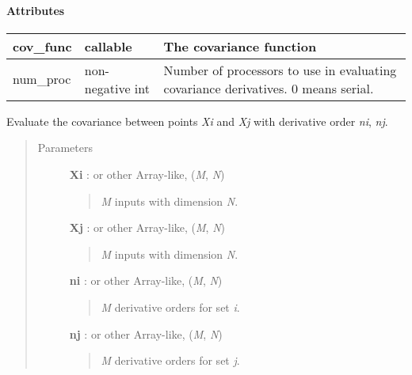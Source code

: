 \documentclass[letterpaper,10pt,english]{sphinxmanual}
\begin{document}
\begin{fulllineitems}
\paragraph{Attributes}

\begin{tabulary}{\linewidth}{|L|L|L|}
\hline

cov\_func
 & 
callable
 & 
The covariance function
\\\hline

num\_proc
 & 
non-negative int
 & 
Number of processors to use in evaluating covariance derivatives. 0 means serial.
\\\hline
\end{tabulary}


\begin{fulllineitems}
\label{gptools.kernel:gptools.kernel.core.ArbitraryKernel.__call__}
Evaluate the covariance between points \emph{Xi} and \emph{Xj} with derivative order \emph{ni}, \emph{nj}.
\begin{quote}\begin{description}
\item[{Parameters }] \leavevmode
\textbf{Xi} :  or other Array-like, (\emph{M}, \emph{N})
\begin{quote}

\emph{M} inputs with dimension \emph{N}.
\end{quote}

\textbf{Xj} :  or other Array-like, (\emph{M}, \emph{N})
\begin{quote}

\emph{M} inputs with dimension \emph{N}.
\end{quote}

\textbf{ni} :  or other Array-like, (\emph{M}, \emph{N})
\begin{quote}

\emph{M} derivative orders for set \emph{i}.
\end{quote}

\textbf{nj} :  or other Array-like, (\emph{M}, \emph{N})
\begin{quote}

\emph{M} derivative orders for set \emph{j}.
\end{quote}


\end{description}
\end{quote}
\end{fulllineitems}
\end{fulllineitems}
\end{document}
